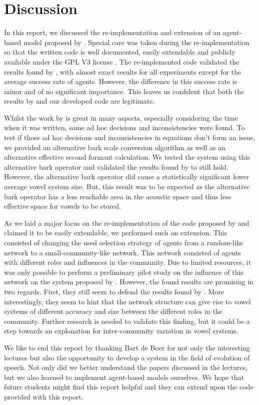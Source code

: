 \chapter{Discussion}
\label{ch:discussion}

In this report, we discussed the re-implementation and extension of an agent-based model proposed by \citet{deBoer2000}.
Special care was taken during the re-implementation so that the written code is well documented, easily extendable and publicly available under the GPL V3 license \citep{gplv3, github_project}.
The re-implemented code validated the results found by \citet{deBoer2000}, with almost exact results for all experiments except for the average success rate of agents.
However, the difference in this success rate is minor and of no significant importance.
This leaves us confident that both the results by \citet{deBoer2000} and our developed code are legitimate.

Whilst the work by \citet{deBoer2000} is great in many aspects, especially considering the time when it was written, some ad hoc decisions and inconsistencies were found.
To test if those ad hoc decisions and inconsistencies in equations don't form an issue, we provided an alternative bark scale conversion algorithm as well as an alternative effective second formant calculation.
We tested the system using this alternative bark operator and validated the results found by \citet{deBoer2000} to still hold.
However, the alternative bark operator did cause a statistically significant lower average vowel system size.
But, this result was to be expected as the alternative bark operator has a less reachable area in the acoustic space and thus less effective space for vowels to be stored.

As we laid a major focus on the re-implementation of the code proposed by \citet{deBoer2000} and claimed it to be easily extendable, we performed such an extension.
This consisted of changing the used selection strategy of agents from a random-like network to a small-community-like network.
This network consisted of agents with different roles and influences in the community.
Due to limited resources, it was only possible to perform a preliminary pilot study on the influence of this network on the system proposed by \citet{deBoer2000}.
However, the found results are promising in two regards.
First, they still seem to defend the results found by \citet{deBoer2000}.
More interestingly, they seem to hint that the network structure can give rise to vowel systems of different accuracy and size between the different roles in the community.
Further research is needed to validate this finding, but it could be a step towards an explanation for inter-community variation in vowel systems.

We like to end this report by thanking Bart de Boer for not only the interesting lectures but also the opportunity to develop a system in the field of evolution of speech.
Not only did we better understand the papers discussed in the lectures, but we also learned to implement agent-based models ourselves.
We hope that future students might find this report helpful and they can extend upon the code provided with this report.